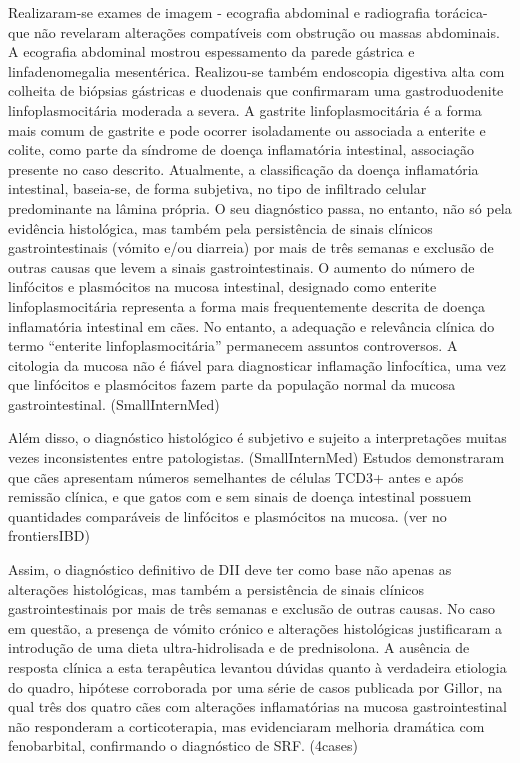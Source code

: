 Realizaram-se exames de imagem - ecografia abdominal e radiografia torácica- que não revelaram alterações compatíveis com obstrução ou massas abdominais. A ecografia abdominal mostrou espessamento da parede gástrica e linfadenomegalia mesentérica.  Realizou-se também endoscopia digestiva alta com colheita de biópsias gástricas e duodenais que confirmaram uma gastroduodenite linfoplasmocitária moderada a severa. A gastrite linfoplasmocitária é a forma mais comum de gastrite e pode ocorrer isoladamente ou associada a enterite e colite, como parte da síndrome de doença inflamatória intestinal, \cite{Amorim2016} associação presente no caso descrito. Atualmente, a classificação da doença inflamatória intestinal, baseia-se, de forma subjetiva, no tipo de infiltrado celular predominante na lâmina própria. O seu diagnóstico passa, no entanto, não só pela evidência histológica, mas também pela persistência de sinais clínicos gastrointestinais (vómito e/ou diarreia) por mais de três semanas e exclusão de outras causas que levem a sinais gastrointestinais. \cite{Jergens2012} O aumento do número de linfócitos e plasmócitos na mucosa intestinal, designado como enterite linfoplasmocitária representa a forma mais frequentemente descrita de doença inflamatória intestinal em cães. No entanto, a adequação e relevância clínica do termo “enterite linfoplasmocitária” permanecem assuntos controversos. A citologia da mucosa não é fiável para diagnosticar inflamação linfocítica, uma vez que linfócitos e plasmócitos fazem parte da população normal da mucosa gastrointestinal. (SmallInternMed) 

Além disso, o diagnóstico histológico é subjetivo e sujeito a interpretações muitas vezes inconsistentes entre patologistas. (SmallInternMed) Estudos demonstraram que cães apresentam números semelhantes de células TCD3+ antes e após remissão clínica, e que gatos com e sem sinais de doença intestinal possuem quantidades comparáveis de linfócitos e plasmócitos na mucosa. (ver no frontiersIBD) 


Assim, o diagnóstico definitivo de DII deve ter como base não apenas as alterações histológicas, mas também a persistência de sinais clínicos gastrointestinais por mais de três semanas e exclusão de outras causas. No caso em questão, a presença de vómito crónico e alterações histológicas justificaram a introdução de uma dieta ultra-hidrolisada e de prednisolona. A ausência de resposta clínica a esta terapêutica levantou dúvidas quanto à verdadeira etiologia do quadro, hipótese corroborada por uma série de casos publicada por Gillor, na qual três dos quatro cães com alterações inflamatórias na mucosa gastrointestinal não responderam a corticoterapia, mas evidenciaram melhoria dramática com fenobarbital, confirmando o diagnóstico de SRF. (4cases)



